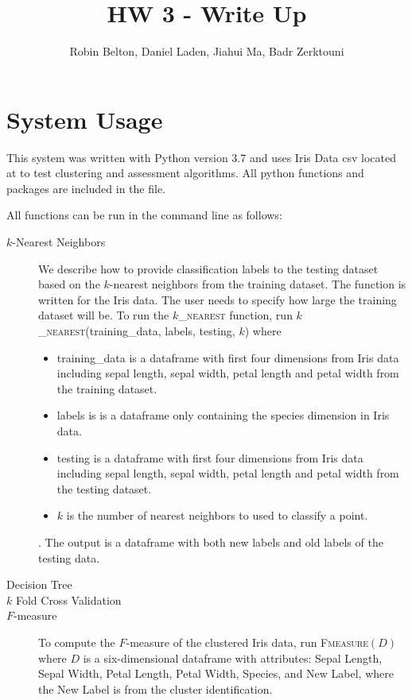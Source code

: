 \documentclass[psamsfonts,onesided,10pt]{amsart}
\title{HW 3 - Write Up}
\author{Robin Belton, Daniel Laden, Jiahui Ma,  Badr Zerktouni}
\begin{document}
\maketitle

\section{System Usage}

This system was written with Python version 3.7 and uses Iris Data csv located at  
to test clustering and assessment algorithms. All python functions and packages are included in the  file.

All functions can be run in the command line as follows:

\begin{description}
\item[$k$-Nearest Neighbors] We describe how to provide classification labels to the testing dataset based on the $k$-nearest neighbors from the training dataset. The function is written for the Iris data. The user needs to specify how large the training dataset will be. To run the \textsc{$k$\_nearest} function, run \textsc{$k$\_nearest}(training\_data, labels, testing, $k$) where 
	\begin{itemize}
	\item training\_data is a dataframe with first four dimensions from Iris data including sepal length, sepal width, petal length and petal width from the training dataset.
	\item labels is is a dataframe only containing the species dimension in Iris data.
	\item testing is a dataframe with first four dimensions from Iris data including sepal length, sepal width, petal length and petal width from the testing dataset.
	\item $k$ is the number of nearest neighbors to used to classify a point.
	\end{itemize}. 
The output is a dataframe with both new labels and old labels of the testing data.
\item[Decision Tree] 
\item[$k$ Fold Cross Validation] 
\item[$F$-measure] To compute the $F$-measure of the clustered Iris data, run \textsc{Fmeasure}$(D)$ 
where $D$ is a six-dimensional dataframe with attributes: Sepal Length, Sepal Width, Petal Length, Petal Width,
              Species, and New Label, where the New Label is from the cluster identification. 
\end{description}
 
\end{document}
